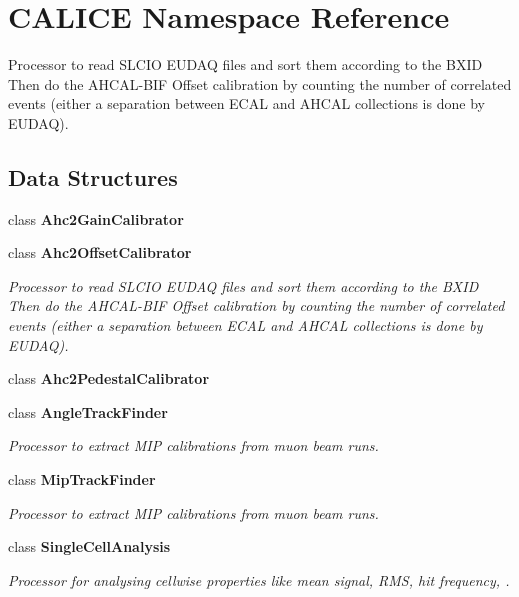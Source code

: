 \section{CALICE Namespace Reference}
\label{namespaceCALICE}


Processor to read SLCIO EUDAQ files and sort them according to the BXID Then do the AHCAL-\/BIF Offset calibration by counting the number of correlated events (either a separation between ECAL and AHCAL collections is done by EUDAQ).  
\subsection*{Data Structures}
\begin{DoxyCompactItemize}
\item 
class {\bf Ahc2GainCalibrator}
\item 
class {\bf Ahc2OffsetCalibrator}
\begin{DoxyCompactList}\small\item\em Processor to read SLCIO EUDAQ files and sort them according to the BXID Then do the AHCAL-\/BIF Offset calibration by counting the number of correlated events (either a separation between ECAL and AHCAL collections is done by EUDAQ). \item\end{DoxyCompactList}\item 
class {\bf Ahc2PedestalCalibrator}
\item 
class {\bf AngleTrackFinder}
\begin{DoxyCompactList}\small\item\em Processor to extract MIP calibrations from muon beam runs. \item\end{DoxyCompactList}\item 
class {\bf MipTrackFinder}
\begin{DoxyCompactList}\small\item\em Processor to extract MIP calibrations from muon beam runs. \item\end{DoxyCompactList}\item 
class {\bf SingleCellAnalysis}
\begin{DoxyCompactList}\small\item\em Processor for analysing cellwise properties like mean signal, RMS, hit frequency, . \item\end{DoxyCompactList}\end{DoxyCompactItemize}
